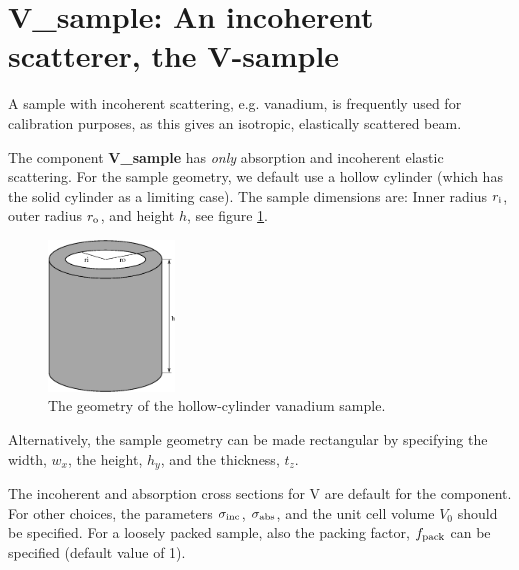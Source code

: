 \section{V\_sample: An incoherent scatterer, the V-sample}
\label{s:v_sample}


A sample with incoherent scattering, e.g. vanadium, is frequently used for
calibration purposes, as this gives an isotropic, elastically scattered beam.

The component {\bf V\_sample}
has {\em only} absorption and incoherent elastic scattering.
For the sample geometry, we default use a
hollow cylinder (which has the solid cylinder as a limiting case).
The sample dimensions are: Inner radius $r_{\rm i}$,
outer radius $r_{\rm o}$, and height $h$, see figure \ref{f:v-sample}.
\begin{figure}
  \begin{center}
    \includegraphics[width=0.3\textwidth]{figures/vsample.eps}
  \end{center}
\caption{The geometry of the hollow-cylinder vanadium sample.}
\label{f:v-sample}
\end{figure}

Alternatively, the sample geometry can be made rectangular
by specifying the width, $w_x$, the height, $h_y$, and the thickness, $t_z$.

The incoherent and absorption cross sections for V are default
for the component. For other choices, the
parameters $\sigma_{\rm inc}$, $\sigma_{\rm abs}$,
and the unit cell volume $V_0$ should be specified.
For a loosely packed sample, also the packing factor, $f_{\rm pack}$
can be specified (default value of 1).


